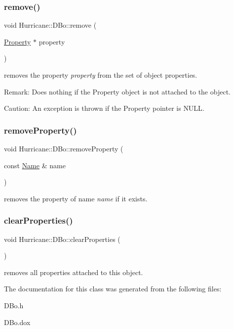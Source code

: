 \subsubsection{\texorpdfstring{remove()}{remove()}}
{\footnotesize\ttfamily void Hurricane\+::\+D\+Bo\+::remove (\begin{DoxyParamCaption}\item[{\mbox{\hyperlink{classHurricane_1_1Property}{Property}} $\ast$}]{property }\end{DoxyParamCaption})}

removes the property {\itshape property} from the set of object properties.

\begin{DoxyParagraph}{Remark\+: Does nothing if the Property object is not attached to the object.}

\end{DoxyParagraph}
\begin{DoxyParagraph}{Caution\+: An exception is thrown if the Property pointer is {\ttfamily N\+U\+LL}.}

\end{DoxyParagraph}
\mbox{\label{classHurricane_1_1DBo_ac35fbb8303b1a78db5ca0fc831fb6a0c}} 
\subsubsection{\texorpdfstring{remove\+Property()}{removeProperty()}}
{\footnotesize\ttfamily void Hurricane\+::\+D\+Bo\+::remove\+Property (\begin{DoxyParamCaption}\item[{const \mbox{\hyperlink{classHurricane_1_1Name}{Name}} \&}]{name }\end{DoxyParamCaption})}

removes the property of name {\itshape name} if it exists. \mbox{\label{classHurricane_1_1DBo_a3e02f3d665cb0b2120df2fdfe9c3df4f}} 
\subsubsection{\texorpdfstring{clear\+Properties()}{clearProperties()}}
{\footnotesize\ttfamily void Hurricane\+::\+D\+Bo\+::clear\+Properties (\begin{DoxyParamCaption}{ }\end{DoxyParamCaption})}

removes all properties attached to this object. 

The documentation for this class was generated from the following files\+:\begin{DoxyCompactItemize}
\item 
D\+Bo.\+h\item 
D\+Bo.\+dox\end{DoxyCompactItemize}
